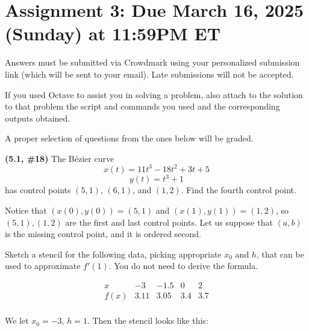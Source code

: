 \documentclass{eh-homework}
\begin{document}
\usetikzlibrary{arrows.meta}
\section*{Assignment 3: Due March 16, 2025 (Sunday) at 11:59PM ET}

Answers must be submitted via Crowdmark using your personalized submission link (which will be sent to your email). Late submissions will not be accepted.

If you used Octave to assist you in solving a problem, also attach to the solution to that problem the script and commands you used and the corresponding outputs obtained.

A proper selection of questions from the ones below will be graded.

\begin{question}{1}
\textbf{(5.1, \#18)} The Bézier curve
\[
x(t) = 11t^3 - 18t^2 + 3t + 5
\]
\[
y(t) = t^3 + 1
\]
has control points \((5,1)\), \((6,1)\), and \((1,2)\). Find the fourth control point.

\bigskip

Notice that \((x(0), y(0)) = (5,1)\) and \((x(1), y(1)) = (1,2)\), so \((5,1), (1,2)\) are the first and last control points. Let us suppose that \((a,b)\) is the missing control point, and it is ordered second.
\end{question}

\begin{question}{2}
Sketch a stencil for the following data, picking appropriate \(x_0\) and \(h\), that can be used to approximate \(f'(1)\). You do not need to derive the formula.

\[
\begin{array}{c|cccc}
x & -3 & -1.5 & 0 & 2 \\
\hline
f(x) & 3.11 & 3.05 & 3.4 & 3.7 \\
\end{array}
\]

\bigskip

We let \(x_0 = -3\), \(h = 1\). Then the stencil looks like this:
\begin{center}
\end{center}
\end{question}
\end{document}

